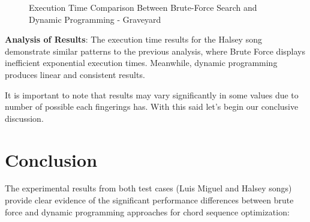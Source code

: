 \documentclass[conference]{IEEEtran}
\begin{document}
\begin{figure}[H]
    \centering
    \caption{Execution Time Comparison Between Brute-Force Search and Dynamic Programming - Graveyard}
    \label{fig:execution-time-graveyard}
\end{figure}
\textbf{Analysis of Results}: The execution time results for the Halsey song demonstrate similar patterns to the previous analysis, where Brute Force displays inefficient exponential execution times. Meanwhile, dynamic programming produces linear and consistent results. 

It is important to note that results may vary significantly in some values due to number of possible each fingerings has. With this said let's begin our conclusive discussion.


\section{Conclusion}
The experimental results from both test cases (Luis Miguel and Halsey songs) provide clear evidence of the significant performance differences between brute force and dynamic programming approaches for chord sequence optimization:
\end{document}
